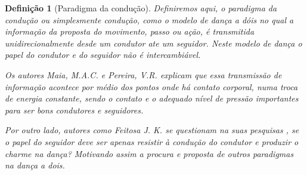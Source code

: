 \documentclass[a4paper,10pt]{article}
\newtheorem{mydef}{Definição}
\begin{document}
\begin{mydef}[Paradigma da condução]
Definiremos aqui, o paradigma da condução ou simplesmente condução, 
como o modelo de dança a dóis no qual a informação da proposta do movimento, 
passo ou ação, é transmitida unidirecionalmente desde um condutor ate um seguidor.
Neste modelo de dança o papel do condutor e do seguidor não é intercambiável.


Os autores Maia, M.A.C. e Pereira, V.R. \cite{maia2010danca} explicam que 
essa transmissão de informação acontece por médio dos pontos onde há contato corporal, numa troca de energia constante,
sendo o contato e o adequado nível de pressão importantes para ser bons condutores e seguidores.

Por outro lado, autores como Feitosa J. K. se questionam na suas pesquisas \cite[pp. 24]{Jonas2011},
se o papel do seguidor deve ser apenas resistir à condução do condutor e produzir o charme na dança?
Motivando assim a procura e proposta de outros paradigmas na dança a dois.




%


\end{mydef}

\end{document}
